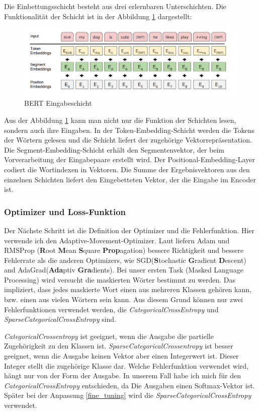 Die Einbettungsschicht besteht aus drei erlernbaren Unterschichten. Die Funktionalität der Schicht ist in der Abbildung \ref{embl} dargestellt:

\begin{figure}
	\centering
	\includegraphics[scale=0.35]{images/bert_embedding_layer.png}
	\caption{BERT Eingabeschicht \cite{BERT:19}}
	\label{embl}
\end{figure}

Aus der Abbildung \ref{embl} kann man nicht nur die Funktion der Schichten lesen, sondern auch ihre Eingaben. In der Token-Embedding-Schicht werden die Tokens der Wörtern gelesen und die Schicht liefert der zugehörige Vektorrepräsentation. Die Segment-Embedding-Schicht erhält den Segmentenvektor, der beim Vorverarbeitung der Eingabepaare erstellt wird. Der Positional-Embedding-Layer codiert die Wortindexen in Vektoren. Die Summe der Ergebnisvektoren aus den einzelnen Schichten liefert den Eingebetteten Vektor, der die Eingabe im Encoder ist. 

\subsubsection{Optimizer und Loss-Funktion}\label{optimizer_and_loss}
Der Nächste Schritt ist die Definition der Optimizer und die Fehlerfunktion. Hier verwende ich den Adaptive-Movement-Optimizer. Laut \cite{CO:19} liefern Adam und RMSProp (\textbf{R}oot \textbf{M}ean \textbf{S}quare \textbf{Prop}agation) bessere Richtigkeit und bessere Fehlerrate als die anderen Optimizers, wie SGD(\textbf{S}tochastic \textbf{G}radient \textbf{D}escent) and AdaGrad(\textbf{Ada}ptiv \textbf{Gra}dients).  
Bei unser ersten Task (Masked Language Processing) wird versucht die maskierten Wörter bestimmt zu werden. Das impliziert, dass jedes maskierte Wort einen aus mehreren Klassen gehören kann, bzw. einen aus vielen Wörtern sein kann. Aus diesem Grund können nur zwei Fehlerfunktionen verwendet werden, die \textit{CategoricalCrossEntropy} und \textit{SparseCategoricalCrossEntropy} sind.

\textit{CategoricalCrossentropy} ist geeignet, wenn die Ausgabe die partielle Zugehörigkeit zu den Klassen ist. \textit{SparseCategoricalCrossentropy} ist besser geeignet, wenn die Ausgabe keinen Vektor aber einen Integerwert ist. Dieser Integer stellt die zugehörige Klasse dar. Welche Fehlerfunktion verwendet wird, hängt nur von der Form der Ausgabe. In unserem Fall habe ich mich für den \textit{CategoricalCrossEntropy} entschieden, da Die Ausgaben einen Softmax-Vektor ist. Später bei der Anpassung \ref{fine_tuning} wird die \textit{SparseCategoricalCrossEntropy} verwendet.

